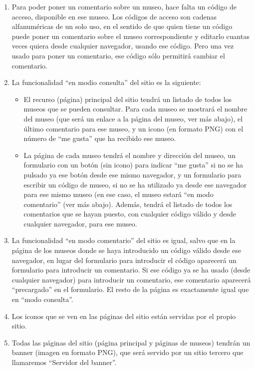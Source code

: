 {\begin{enumerate}
\item Para poder poner un comentario sobre un museo, hace falta un código de acceso, disponible en ese museo. Los códigos de acceso son cadenas alfanuméricas de un solo uso, en el sentido de que quien tiene un código puede poner un comentario sobre el museo correspondiente y editarlo cuantas veces quiera desde cualquier navegador, usando ese código. Pero una vez usado para poner un comentario, ese código sólo permitirá cambiar el comentario.

\item La funcionalidad ``en modio consulta'' del sitio es la siguiente:
  \begin{itemize}
  \item El recurso (página) principal del sitio tendrá un listado de todos los museos que se pueden consultar. Para cada museo se mostrará el nombre del museo (que será un enlace a la página del museo, ver más abajo), el último comentario para ese museo, y un icono (en formato PNG) con el número de ``me gusta'' que ha recibido ese museo.
  \item La página de cada museo tendrá el nombre y dirección del museo, un formulario con un botón (sin icono) para indicar ``me gusta'' si no se ha pulsado ya ese botón desde ese mismo navegador, y un formulario para escribir un código de museo, si no se ha utilizado ya desde ese navegador para ese mismo museo (en ese caso, el museo estará ``en modo comentario'' (ver más abajo). Además, tendrá el listado de todos los comentarios que se hayan puesto, con cualquier código válido y desde cualquier navegador, para ese museo.
  \end{itemize}

\item La funcionalidad ``en modo comentario'' del sitio es igual, salvo que en la página de los museos donde se haya introducido un código válido desde ese navegador, en lugar del formulario para introducir el código aparecerá un formulario para introducir un comentario. Si ese código ya  se ha usado (desde cualquier navegador) para introducir un comentario, ese comentario aparecerá ``precargado'' en el formulario. El resto de la página es exactamente igual que en ``modo consulta''.

\item Los iconos que se ven en las páginas del sitio están servidas por el propio sitio.

\item Todas las páginas del sitio (página principal y páginas de museos) tendrán un banner (imagen en formato PNG), que será servido por un sitio tercero que llamaremos ``Servidor del banner''.
\end{enumerate}


}
